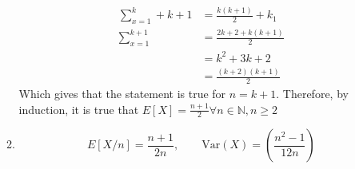 \documentclass{article}
\theoremstyle{definition}
\theoremstyle{remark}
\theoremstyle{example}
\newcommand{\N}{\mathbb{N}}
\newcommand{\Var}[1]{\mathrm{Var}\left(#1\right)}
\begin{document}
\begin{enumerate}
\begin{enumerate}
			\begin{align*}
				\sum_{x=1}^{k} + k + 1 &= \frac{k(k+1)}{2} + k_1\\
				\sum_{x=1}^{k+1} &= \frac{2k+2+k(k+1)}{2}\\
				&= k^2+3k+2\\
				&= \frac{(k+2)(k+1)}{2}
			\end{align*}
			Which gives that the statement is true for $n=k+1$. Therefore, by induction, it is true that $E[X]=\frac{n+1}{2} \forall n \in \N , n\geq 2$
				\item \[E[X/n]=\frac{n+1}{2n},\qquad \Var{X}=(\frac{n^2-1}{12n})\]
		\end{enumerate}
	\end{enumerate}
\end{document}

